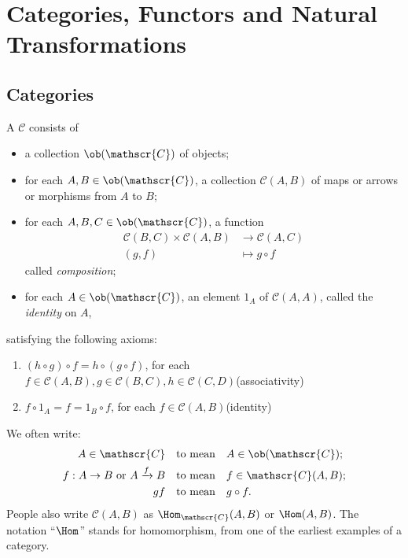 \chapter{Categories, Functors and Natural Transformations}
\section{Categories}
\begin{definition}
A  $\mathscr{C}$ consists of
\begin{itemize}
\item a collection $\ob(\mathscr{C})$ of objects;
\item for each $A,B\in\ob(\mathscr{C})$, a collection $\mathscr{C}(A,B)$ of maps or arrows or morphisms from $A$ to $B$;
\item for each $A,B,C\in\ob(\mathscr{C})$, a function
\begin{align*}
\mathscr{C}(B,C)\times\mathscr{C}(A,B)&\to\mathscr{C}(A,C)\\
(g,f)&\mapsto g\circ f
\end{align*}
called \emph{composition};
\item for each $A\in\ob(\mathscr{C})$, an element $1_A$ of $\mathscr{C}(A,A)$, called the \emph{identity} on $A$,
\end{itemize}
satisfying the following axioms:
\begin{enumerate}[label=(\roman*)]
\item $(h\circ g)\circ f=h\circ(g\circ f)$, for each $f\in\mathscr{C}(A,B), g\in\mathscr{C}(B,C), h\in\mathscr{C}(C,D)$\hfill(associativity)
\item $f\circ 1_A=f=1_B\circ f$, for each $f\in\mathscr{C}(A,B)$\hfill(identity)
\end{enumerate}
\end{definition}

\begin{notation}
We often write:
\begin{align*}
A\in\mathscr{C}&\quad\text{to mean}\quad A\in\ob(\mathscr{C});\\
f:A\to B\text{ or }A\xrightarrow{f}B&\quad\text{to mean}\quad f\in\mathscr{C}(A,B);\\
gf&\quad\text{to mean}\quad g\circ f.
\end{align*}
People also write $\mathscr{C}(A,B)$ as $\Hom_\mathscr{C}(A,B)$ or $\Hom(A,B)$. The notation ``$\Hom$'' stands for homomorphism, from one of the earliest examples of a category.
\end{notation}

